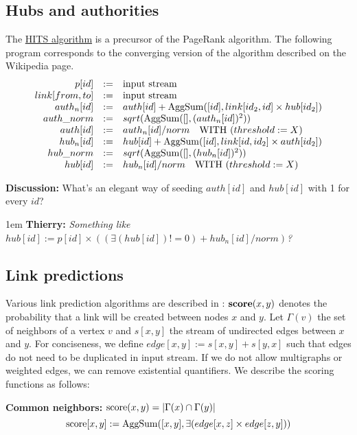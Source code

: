 \documentclass[11pt]{article}
\newlength{\dlen}
\def\discuss#1{\par\hspace{2em}
\setlength{\dlen}{\textwidth}
\addtolength{\dlen}{-2em}
\begin{minipage}{\dlen}\footnotesize {\bf\color{red} Discussion:} #1\end{minipage}\par}
\def\say#1#2{\begingroup\par\leftskip1em {\bf #1:} \it #2\par\endgroup}
\begin{document}
\subsection{Hubs and authorities}
The \href{http://en.wikipedia.org/wiki/HITS_algorithm}{HITS algorithm} is a precursor of the PageRank algorithm.
The following program corresponds to the converging version of the algorithm described on the Wikipedia page.
\[\begin{array}{rcl}
p[id] &:=& \text{input stream} \\
link[from,to] &:=& \text{input stream} \\
auth_n[id] &:=& auth[id] + {\rm AggSum}([id], link[id_2,id] \times hub[id_2]) \\
auth\_norm &:=& sqrt({\rm AggSum}([], (auth_n[id])^2)) \\
auth[id] &:=& auth_n[id] / norm \quad\text{WITH } (threshold := X)\\
hub_n[id] &:=& hub[id] + {\rm AggSum}([id], link[id,id_2] \times auth[id_2]) \\
hub\_norm &:=& sqrt({\rm AggSum}([], (hub_n[id])^2)) \\
hub[id] &:=& hub_n[id] / norm \quad\text{WITH } (threshold := X)\\
\end{array}\]
\discuss{What's an elegant way of seeding $auth[id]$ and $hub[id]$ with 1 for every $id$?
\say{Thierry}{Something like $hub[id] := p[id] \times ((\exists(hub[id])!=0) + hub_n[id] / norm)$?}
} 

\subsection{Link predictions}
Various link prediction algorithms are described in \cite{linkpred}: ${\bf score}(x,y)$ denotes the probability that a link will be created between nodes $x$ and $y$. Let $\Gamma(v)$ the set of neighbors of a vertex $v$ and $s[x,y]$ the stream of undirected edges between $x$ and $y$. For conciseness, we define $edge[x,y] := s[x,y]+s[y,x]$ such that edges do not need to be duplicated in input stream. If we do not allow multigraphs or weighted edges, we can remove existential quantifiers. We describe the scoring functions as follows:

{\bf Common neighbors:} ${\rm score}(x,y)=|\Gamma(x) \cap \Gamma(y)|$
\[{\rm score}[x,y] := {\rm AggSum}([x,y], \exists(edge[x,z] \times edge[z,y]))\]
\end{document}

